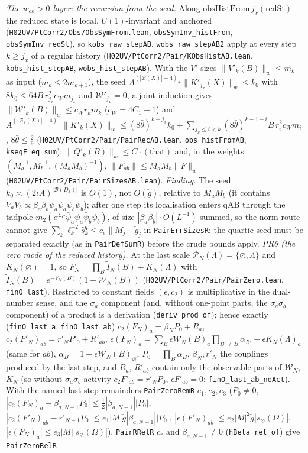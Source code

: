 \documentclass[11pt]{amsart}
\theoremstyle{definition}
\theoremstyle{remark}
\numberwithin{equation}{section}
\begin{document}
\emph{The $w_{ab}>0$ layer: the recursion from the seed.} Along $\mathrm{obsHistFrom}\,j_x(\mathrm{redSt})$ the reduced state is local, $U(1)$-invariant and anchored (\texttt{H02UV/PtCorr2/Obs/ObsSymFrom.lean}, \texttt{obsSymInv\_histFrom}, \texttt{obsSymInv\_redSt}), so \texttt{kobs\_raw\_stepAB}, \texttt{wobs\_raw\_stepAB2} apply at every step $k\ge j_x$ of a regular history (\texttt{H02UV/PtCorr2/Pair/KObsHistAB.lean}, \texttt{kobs\_hist\_stepAB}, \texttt{wobs\_hist\_stepAB}). With the $V'$-sizes $\|V'_k(B)\|_w\le m_k$ as input ($m_k\le2m_{k+1}$), the seed $A^{(|\mathcal B(X)|-4)_+}\|K'_{j_x}(X)\|_w\le k_0$ with $8k_0\le64B\,r_{j_x}^2c_Wm_{j_x}$ and $\mathcal W'_{j_x}=0$, a joint induction gives $\|\mathcal W'_k(B)\|_w\le c_Wr_km_k$ ($c_W=4C_1+1$) and $A^{(|\mathcal B_k(X)|-4)_+}\|K'_k(X)\|_w\le(8\bar\theta)^{k-j_x}k_0+\sum_{j_x\le i<k}(8\bar\theta)^{k-1-i}B\,r_i^2c_Wm_i$, $8\bar\theta\le\frac29$ (\texttt{H02UV/PtCorr2/Pair/PairRecAB.lean}, \texttt{obs\_histFromAB}, \texttt{kseqF\_eq\_sum}); $\|Q'_k(B)\|_w\le C\cdot(\text{that})$ and, in the weights $(M_a^{-1},M_b^{-1},(M_aM_b)^{-1})$, $\|F_{ab}\|\le M_aM_b\|F\|_w$ (\texttt{H02UV/PtCorr2/Pair/PairSizesAB.lean}). \emph{Finding.} The seed $k_0\asymp(2\iota A)^{|\mathcal B(D_x)|}$ is $O(1)$, not $O(\check g)$, relative to $M_aM_b$ (it contains $V_aV_b\propto\beta_a\beta_b\bar\psi_a\psi_a\bar\psi_b\psi_b$); after one step its localisation enters $\mathrm{qAB}$ through the tadpole $m_2(e^{\mathcal L_C}\bar\psi_a\psi_a\bar\psi_b\psi_b)$, of size $|\beta_a\beta_b|\cdot O(L^{-1})$ summed, so the norm route cannot give $\sum_k\ell_k^{-2}\hat s^q_k\le c_e\|M_j\|\check g_j$ in \texttt{PairErrSizesR}: the quartic seed must be separated exactly (as in \texttt{PairDefSumR}) before the crude bounds apply. \emph{PR6 (the zero mode of the reduced history).} At the last scale $\mathcal P_N(\Lambda)=\{\varnothing,\Lambda\}$ and $K_N(\varnothing)=1$, so $F_N=\prod_B\tilde I_N(B)+K_N(\Lambda)$ with $\tilde I_N(B)=e^{-V_N(B)}(1+\mathcal W_N(B))$ (\texttt{H02UV/PtCorr2/Pair/PairZero.lean}, \texttt{finO\_last}). Restricted to constant fields $(\epsilon,c_2)$ is multiplicative in the dual-number sense, and the $\sigma_a$ component (and, without one-point parts, the $\sigma_a\sigma_b$ component) of a product is a derivation (\texttt{deriv\_prod\_of}); hence exactly (\texttt{finO\_last\_a}, \texttt{finO\_last\_ab}) $c_2(F_N)_a=\beta_NP_0+R_a$, $c_2(F'_N)_{ab}=r'_NP'_0+R'_{ab}$, $\epsilon(F_N)_a=\sum_B\epsilon\mathcal W_N(B)_a\prod_{B'\ne B}\alpha_{B'}+\epsilon K_N(\Lambda)_a$ (same for $ab$), $\alpha_B=1+\epsilon\mathcal W_N(B)_\varnothing$, $P_0=\prod_B\alpha_B$, $\beta_N,r'_N$ the couplings produced by the last step, and $R_a$, $R'_{ab}$ contain only the observable parts of $\mathcal W_N$, $K_N$ (so without $\sigma_a\sigma_b$ activity $c_2F'_{ab}=r'_NP_0$, $\epsilon F'_{ab}=0$: \texttt{finO\_last\_ab\_noAct}). With the named last-step remainders \texttt{PairZeroRemR} $e_1,e_2,e_3$ ($P_0\ne0$, $|c_2(F_N)_a-\beta_{a,N-1}P_0|\le\frac12|\beta_{a,N-1}||P_0|$, $|c_2(F'_N)_{ab}-r'_{N-1}P_0|\le e_1|M|\check g|\beta_{a,N-1}||P_0|$, $|\epsilon(F'_N)_{ab}|\le e_2|M|^2\check g|s_\varnothing(\Omega)|$, $|\epsilon(F_N)_a|\le e_3|M||s_\varnothing(\Omega)|$), \texttt{PairRRelR} $c_r$ and $\beta_{a,N-1}\ne0$ (\texttt{hBeta\_rel\_of}) give \texttt{PairZeroRelR} 
\end{document}
